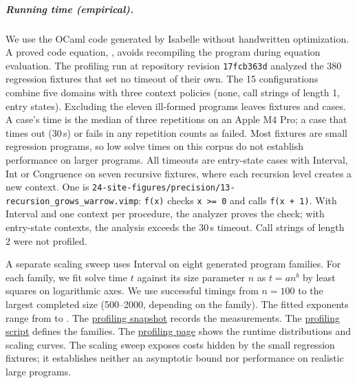\subparagraph*{Running time (empirical).}
We use the OCaml code generated by Isabelle without handwritten optimization.
A proved code equation, , avoids recompiling
the program during equation evaluation.
The profiling run at repository revision
\texttt{17fcb363d} analyzed the 380 regression fixtures that set no timeout of
their own. The 15 configurations combine five domains with three context policies
(none, call strings of length 1, entry states). Excluding the eleven
ill-formed programs leaves 
fixtures and  cases. A case's time is the median of three repetitions on an
Apple M4 Pro; a case that times out (30\,s) or fails in any repetition counts
as failed. Most fixtures are small regression programs, so low solve times
on this corpus do not establish performance on larger programs. All  timeouts are entry-state cases with
Interval, Int or Congruence on seven recursive fixtures, where each recursion
level creates a new context. One is
\texttt{24-site-figures/precision/13-recursion\_grows\_warrow.vimp}: \texttt{f(x)}
checks \texttt{x >= 0} and calls \texttt{f(x + 1)}. With Interval and one context
per procedure, the analyzer proves the check; with entry-state contexts, the
analysis exceeds the 30\,s timeout. Call strings of length 2 were not profiled.

A separate scaling sweep uses Interval on eight generated program families.
For each family, we fit solve time $t$ against its size parameter $n$ as
$t = a n^b$ by least squares on logarithmic axes. We use successful timings
from $n=100$ to the largest completed size (500--2000, depending on the family). The fitted exponents range from  to
. The
\href{https://github.com/ManuelLerchner/Voblint-Verification-Master-Thesis/blob/main/pages/data/profiling/2026-10-21-17fcb363d.json}{profiling snapshot}
records the measurements. The
\href{https://github.com/ManuelLerchner/Voblint-Verification-Master-Thesis/blob/main/scripts/profile_corpus.py}{profiling script}
defines the families. The
\href{https://manuellerchner.github.io/Voblint-Verification-Master-Thesis/profiling.html}{profiling page}
shows the runtime distributions and scaling curves. The scaling sweep exposes
costs hidden by the small regression fixtures; it establishes neither an
asymptotic bound nor performance on realistic large programs.
